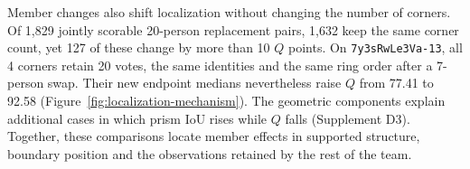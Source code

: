 Member changes also shift localization without changing the number of corners. Of 1,829 jointly scorable 20-person replacement pairs, 1,632 keep the same corner count, yet 127 of these change by more than 10 $Q$ points. On \texttt{7y3sRwLe3Va-13}, all 4 corners retain 20 votes, the same identities and the same ring order after a 7-person swap. Their new endpoint medians nevertheless raise $Q$ from 77.41 to 92.58 (Figure~\ref{fig:localization-mechanism}). The geometric components explain additional cases in which prism IoU rises while $Q$ falls (Supplement D3). Together, these comparisons locate member effects in supported structure, boundary position and the observations retained by the rest of the team.



